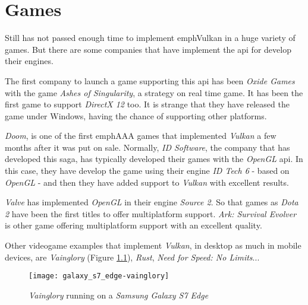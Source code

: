 \chapter{Games}
Still has not passed enough time to implement emph{Vulkan} in a huge variety of games. But there are some companies that
have implement the \gls{api} for develop their engines.

The first company to launch a game supporting this \gls{api} has been \emph{Oxide Games} with the game \emph{Ashes of
Singularity}, a strategy on real time game. It has been the first game to support \emph{DirectX 12} too. It is strange
that they have released the game under Windows, having the chance of supporting other platforms.

\emph{Doom}, is one of the first emph{AAA} games that implemented \emph{Vulkan} a few months after it was put on sale.
Normally, \emph{ID Software}, the company that has developed this saga, has typically developed their games with the
\emph{OpenGL} \gls{api}. In this case, they have develop the game using their engine \emph{ID Tech 6} - based on
\emph{OpenGL} - and then they have added support to \emph{Vulkan} with excellent results.

\emph{Valve} has implemented \emph{OpenGL} in their engine \emph{Source 2}. So that games as \emph{Dota 2} have been
the first titles to offer multiplatform support. \emph{Ark: Survival Evolver} is other game offering multiplatform
support with an excellent quality.

Other videogame examples that implement \emph{Vulkan}, in desktop as much in mobile devices, are \emph{Vainglory}
(Figure \ref{fig:vainglory}), \emph{Rust}, \emph{Need for Speed: No Limits}...

\begin{figure}[t]
	\begin{center}
		\texttt{[image: galaxy\_s7\_edge-vainglory]}
		\caption{\emph{Vainglory} running on a \emph{Samsung Galaxy S7 Edge}}
		\label{fig:vainglory}
	\end{center}
\end{figure}
